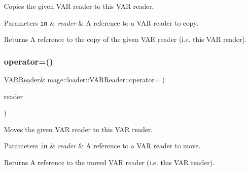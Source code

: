 Copies the given V\+AR reader to this V\+AR reader.


\begin{DoxyParams}[1]{Parameters}
\mbox{\tt in}  & {\em reader} & A reference to a V\+AR reader to copy. \\
\hline
\end{DoxyParams}
\begin{DoxyReturn}{Returns}
A reference to the copy of the given V\+AR reader (i.\+e. this V\+AR reader). 
\end{DoxyReturn}
\mbox{\label{classmage_1_1loader_1_1_v_a_r_reader_a0da01229f594cb701b3e20d53be9d16e}} 
\subsubsection{\texorpdfstring{operator=()}{operator=()}\hspace{0.1cm}{\footnotesize\ttfamily [2/2]}}
{\footnotesize\ttfamily \mbox{\hyperlink{classmage_1_1loader_1_1_v_a_r_reader}{V\+A\+R\+Reader}}\& mage\+::loader\+::\+V\+A\+R\+Reader\+::operator= (\begin{DoxyParamCaption}\item[{\mbox{\hyperlink{classmage_1_1loader_1_1_v_a_r_reader}{V\+A\+R\+Reader}} \&\&}]{reader }\end{DoxyParamCaption})\hspace{0.3cm}{\ttfamily [delete]}}

Moves the given V\+AR reader to this V\+AR reader.


\begin{DoxyParams}[1]{Parameters}
\mbox{\tt in}  & {\em reader} & A reference to a V\+AR reader to move. \\
\hline
\end{DoxyParams}
\begin{DoxyReturn}{Returns}
A reference to the moved V\+AR reader (i.\+e. this V\+AR reader). 
\end{DoxyReturn}
\mbox{\label{classmage_1_1loader_1_1_v_a_r_reader_ad4236487534d5dba6582613317317092}} 
